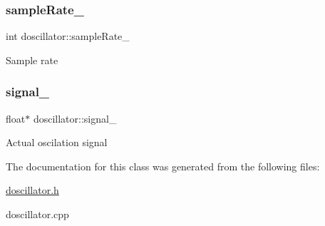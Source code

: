 \subsubsection{\texorpdfstring{sample\+Rate\+\_\+}{sampleRate\_}}
{\footnotesize\ttfamily int doscillator\+::sample\+Rate\+\_\+\hspace{0.3cm}{\ttfamily [protected]}}

Sample rate \mbox{\label{classdoscillator_a4ebb6a37be6a061d025c3f80ee4de6a2}} 
\subsubsection{\texorpdfstring{signal\+\_\+}{signal\_}}
{\footnotesize\ttfamily float$\ast$ doscillator\+::signal\+\_\+\hspace{0.3cm}{\ttfamily [protected]}}

Actual oscilation signal 

The documentation for this class was generated from the following files\+:\begin{DoxyCompactItemize}
\item 
\hyperlink{doscillator_8h}{doscillator.\+h}\item 
doscillator.\+cpp\end{DoxyCompactItemize}
